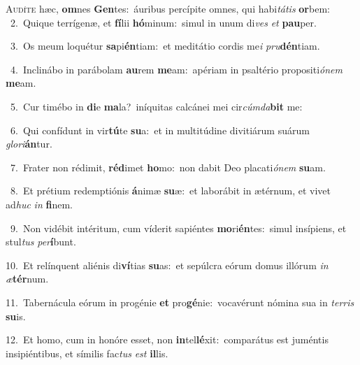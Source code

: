 \lettrine{\initial\textcolor{\initialcolor}{A}}{udíte} hæc, \textbf{om}\-nes \textbf{Gen}\-tes:~\star áuribus percípite omnes, qui habi\-\textit{tá}\-\textit{tis} \textbf{or}\-bem:\\
{\numbfont\textcolor{\numbcolor}{~2.}}~Quique terrígenæ, et \textbf{fí}\-lii \textbf{hó}\-minum:~\star simul in unum di\textit{ves} \textit{et} \textbf{pau}\-per.\par
{\numbfont\textcolor{\numbcolor}{~3.}}~Os meum loquétur \textbf{sa}\-pi\-\textbf{én}\-tiam:~\star et meditátio cordis me\textit{i} \textit{pru}\-\textbf{dén}tiam.\par
{\numbfont\textcolor{\numbcolor}{~4.}}~Inclinábo in parábolam \textbf{au}\-rem \textbf{me}\-am:~\star apériam in psaltério propositi\-\textit{ó}\-\textit{nem} \textbf{me}\-am.\par
{\numbfont\textcolor{\numbcolor}{~5.}}~Cur timébo in \textbf{di}\-e \textbf{ma}\-la?~\star iníquitas calcánei mei cir\-\textit{cúm}\-\textit{da}\textbf{bit} me:\par
{\numbfont\textcolor{\numbcolor}{~6.}}~Qui confídunt in vir\-\textbf{tú}\-te \textbf{su}\-a:~\star et in multitúdine divitiárum suárum \textit{glo}\-\textit{ri}\textbf{án}tur.\par
{\numbfont\textcolor{\numbcolor}{~7.}}~Frater non rédimit, \textbf{réd}\-imet \textbf{ho}\-mo:~\star non dabit Deo placati\-\textit{ó}\-\textit{nem} \textbf{su}\-am.\par
{\numbfont\textcolor{\numbcolor}{~8.}}~Et prétium redemptiónis \textbf{á}\-nimæ \textbf{su}\-æ:~\star et laborábit in ætérnum, et vivet ad\textit{huc} \textit{in} \textbf{fi}\-nem.\par
{\numbfont\textcolor{\numbcolor}{~9.}}~Non vidébit intéritum, cum víderit sapiéntes \textbf{mo}\-ri\-\textbf{én}\-tes:~\star simul insípiens, et stul\textit{tus} \textit{per}\-\textbf{í}bunt.\par
{\numbfont\textcolor{\numbcolor}{10.}}~Et relínquent aliénis di\-\textbf{ví}\-tias \textbf{su}\-as:~\star et sepúlcra eórum domus illórum \textit{in} \textit{æ}\-\textbf{tér}num.\par
{\numbfont\textcolor{\numbcolor}{11.}}~Tabernácula eórum in progénie \textbf{et} pro\-\textbf{gé}\-nie:~\star vocavérunt nómina sua in \textit{ter}\-\textit{ris} \textbf{su}\-is.\par
{\numbfont\textcolor{\numbcolor}{12.}}~Et homo, cum in honóre esset, non \textbf{in}\-tel\-\textbf{lé}\-xit:~\star comparátus est juméntis insipiéntibus, et símilis fac\textit{tus} \textit{est} \textbf{il}\-lis.\par
